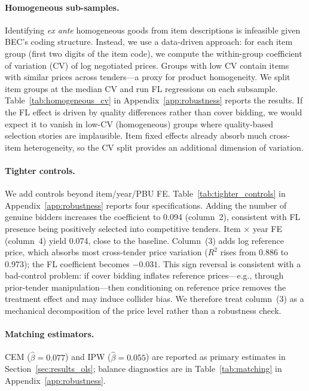 \paragraph{Homogeneous sub-samples.}
Identifying \emph{ex ante} homogeneous goods from item descriptions is
infeasible given BEC's coding structure. Instead, we use a data-driven
approach: for each item group (first two digits of the item code), we
compute the within-group coefficient of variation (CV) of log negotiated
prices. Groups with low CV contain items with similar prices across
tenders---a proxy for product homogeneity. We split item groups at the
median CV and run FL regressions on each subsample.
Table~\ref{tab:homogeneous_cv} in Appendix~\ref{app:robustness} reports
the results. If the FL effect is driven by quality differences rather
than cover bidding, we would expect it to vanish in low-CV (homogeneous)
groups where quality-based selection stories are implausible. Item fixed
effects already absorb much cross-item heterogeneity, so the CV split
provides an additional dimension of variation.

\paragraph{Tighter controls.}
We add controls beyond item/year/PBU FE.
Table~\ref{tab:tighter_controls} in Appendix~\ref{app:robustness}
reports four specifications. Adding the number of genuine bidders
increases the coefficient to 0.094 (column~2), consistent with FL
presence being positively selected into competitive tenders.
Item $\times$ year FE (column~4) yield 0.074, close to the baseline.
Column~(3) adds log reference price, which absorbs most cross-tender
price variation ($R^2$ rises from 0.886 to 0.973); the FL coefficient
becomes $-0.031$. This sign reversal is consistent with a bad-control
problem: if cover bidding inflates reference prices---e.g., through
prior-tender manipulation---then conditioning on reference price removes
the treatment effect and may induce collider bias. We therefore treat
column~(3) as a mechanical decomposition of the price level rather than
a robustness check.

\paragraph{Matching estimators.} %
CEM ($\hat{\beta} = 0.077$) and IPW ($\hat{\beta} = 0.055$) are
reported as primary estimates in Section~\ref{sec:results_ols};
balance diagnostics are in Table~\ref{tab:matching} in
Appendix~\ref{app:robustness}.

